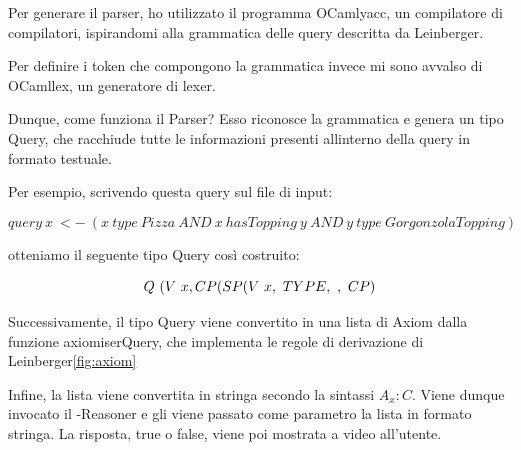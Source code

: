         Per generare il parser, ho utilizzato il programma OCamlyacc, un compilatore di compilatori, ispirandomi alla grammatica delle query descritta da Leinberger. %

        Per definire i token che compongono la grammatica invece mi sono avvalso di OCamllex, un generatore di lexer. 

        Dunque, come funziona il Parser? Esso riconosce la grammatica e genera un tipo Query, che racchiude tutte le informazioni presenti allinterno della query in formato testuale. 

        Per esempio, scrivendo questa query sul file di input: 
        
        $$ query \ x \ <- \ (x \ type \ Pizza \ AND \ x \ hasTopping \ y \ AND \ y \ type \ GorgonzolaTopping) $$
        
        otteniamo il seguente tipo Query così costruito: %

        $$ Q \  (V \ x, \\
            CP(SP(V \ x,\ TYPE, \ ,\ CP)$$

        Successivamente, il tipo Query viene convertito in una lista di Axiom dalla funzione axiomiserQuery, che implementa le regole di derivazione di Leinberger\ref{fig:axiom}



        

        
        Infine, la lista viene convertita in stringa secondo la sintassi \(A_{x} : C\). Viene dunque invocato il -Reasoner e gli viene passato come parametro la lista in formato stringa. La risposta, true o false, viene poi mostrata a video all'utente. 
    
